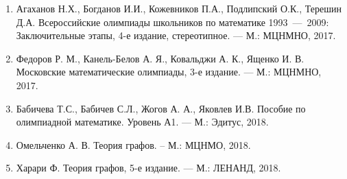\begin{enumerate}
\item Агаханов Н.Х., Богданов И.И., Кожевников П.А., Подлипский О.К., Терешин Д.А. Всероссийские олимпиады школьников по математике 1993~---~2009: Заключительные этапы, 4-е издание, стереотипное. --- М.: МЦНМНО, 2017. 
\item Федоров Р. М., Канель-Белов А. Я., Ковальджи А. К., Ященко И. В. Московские математические олимпиады, 3-е издание. --- М.: МЦНМНО, 2017. 
\item Бабичева Т.С., Бабичев С.Л., Жогов А. А., Яковлев И.В. Пособие по олимпиадной математике. Уровень А1. --- М.: Эдитус, 2018.
\item Омельченко А. В. Теория графов. -- М.: МЦНМО, 2018.
\item Харари Ф. Теория графов, 5-е издание. --- М.: ЛЕНАНД, 2018.
\end{enumerate}


